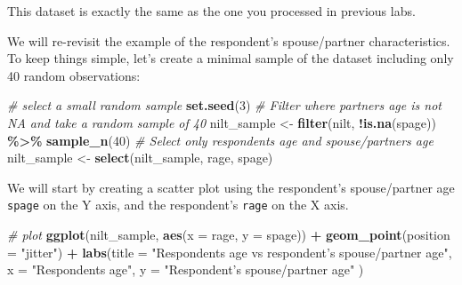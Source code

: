 \documentclass[
]{book}
\newenvironment{Shaded}{\begin{snugshade}}{\end{snugshade}}
\newcommand{\AttributeTok}[1]{\textcolor[rgb]{0.13,0.29,0.53}{#1}}
\newcommand{\CommentTok}[1]{\textcolor[rgb]{0.56,0.35,0.01}{\textit{#1}}}
\newcommand{\DecValTok}[1]{\textcolor[rgb]{0.00,0.00,0.81}{#1}}
\newcommand{\FunctionTok}[1]{\textcolor[rgb]{0.13,0.29,0.53}{\textbf{#1}}}
\newcommand{\NormalTok}[1]{#1}
\newcommand{\OtherTok}[1]{\textcolor[rgb]{0.56,0.35,0.01}{#1}}
\newcommand{\SpecialCharTok}[1]{\textcolor[rgb]{0.81,0.36,0.00}{\textbf{#1}}}
\newcommand{\StringTok}[1]{\textcolor[rgb]{0.31,0.60,0.02}{#1}}
\begin{document}
This dataset is exactly the same as the one you processed in previous labs.

We will re-revisit the example of the respondent's spouse/partner characteristics. To keep things simple, let's create a minimal sample of the dataset including only 40 random observations:

\begin{Shaded}
\begin{Highlighting}[]
\CommentTok{\# select a small random sample}
\FunctionTok{set.seed}\NormalTok{(}\DecValTok{3}\NormalTok{)}
\CommentTok{\# Filter where partner\textquotesingle{}s age is not NA and take a random sample of 40}
\NormalTok{nilt\_sample }\OtherTok{\textless{}{-}} \FunctionTok{filter}\NormalTok{(nilt, }\SpecialCharTok{!}\FunctionTok{is.na}\NormalTok{(spage)) }\SpecialCharTok{\%\textgreater{}\%} \FunctionTok{sample\_n}\NormalTok{(}\DecValTok{40}\NormalTok{)}
\CommentTok{\# Select only respondent\textquotesingle{}s age and spouse/partner\textquotesingle{}s age}
\NormalTok{nilt\_sample }\OtherTok{\textless{}{-}} \FunctionTok{select}\NormalTok{(nilt\_sample, rage, spage)}
\end{Highlighting}
\end{Shaded}

We will start by creating a scatter plot using the respondent's spouse/partner age \texttt{spage} on the Y axis, and the respondent's \texttt{rage} on the X axis.

\begin{Shaded}
\begin{Highlighting}[]
\CommentTok{\# plot}
\FunctionTok{ggplot}\NormalTok{(nilt\_sample,  }\FunctionTok{aes}\NormalTok{(}\AttributeTok{x =}\NormalTok{ rage, }\AttributeTok{y =}\NormalTok{ spage)) }\SpecialCharTok{+} 
  \FunctionTok{geom\_point}\NormalTok{(}\AttributeTok{position =} \StringTok{"jitter"}\NormalTok{) }\SpecialCharTok{+}
  \FunctionTok{labs}\NormalTok{(}\AttributeTok{title =} \StringTok{"Respondent\textquotesingle{}s age vs respondent’s spouse/partner age"}\NormalTok{, }
       \AttributeTok{x =} \StringTok{"Respondent\textquotesingle{}s age"}\NormalTok{, }\AttributeTok{y =} \StringTok{"Respondent’s spouse/partner age"}\NormalTok{ )}
\end{Highlighting}
\end{Shaded}
\end{document}
